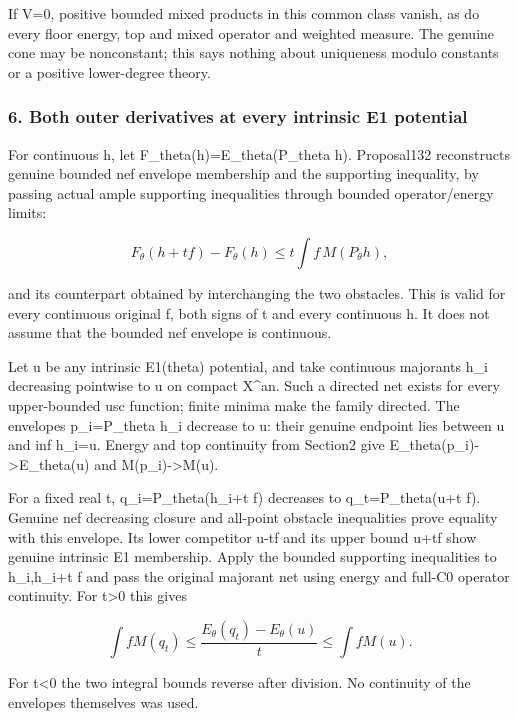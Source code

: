 \documentclass[
]{article}
\begin{document}
If V=0, positive bounded mixed products in this common class vanish, as
do every floor energy, top and mixed operator and weighted measure. The
genuine cone may be nonconstant; this says nothing about uniqueness
modulo constants or a positive lower-degree theory.

\subsubsection{6. Both outer derivatives at every intrinsic E1
potential}\label{both-outer-derivatives-at-every-intrinsic-e1-potential}

For continuous h, let F\_theta(h)=E\_theta(P\_theta h). Proposal132
reconstructs genuine bounded nef envelope membership and the supporting
inequality, by passing actual ample supporting inequalities through
bounded operator/energy limits:

\[F_\theta(h+t f)-F_\theta(h)
\le t\int f\,M(P_\theta h),\]

and its counterpart obtained by interchanging the two obstacles. This is
valid for every continuous original f, both signs of t and every
continuous h. It does not assume that the bounded nef envelope is
continuous.

Let u be any intrinsic E1(theta) potential, and take continuous
majorants h\_i decreasing pointwise to u on compact X\^{}an. Such a
directed net exists for every upper-bounded usc function; finite minima
make the family directed. The envelopes p\_i=P\_theta h\_i decrease to
u: their genuine endpoint lies between u and inf h\_i=u. Energy and top
continuity from Section2 give E\_theta(p\_i)-\textgreater E\_theta(u)
and M(p\_i)-\textgreater M(u).

For a fixed real t, q\_i=P\_theta(h\_i+t f) decreases to
q\_t=P\_theta(u+t f). Genuine nef decreasing closure and all-point
obstacle inequalities prove equality with this envelope. Its lower
competitor u-\textbar t\textbar\textbar\textbar f\textbar\textbar{} and
its upper bound u+\textbar t\textbar\textbar\textbar f\textbar\textbar{}
show genuine intrinsic E1 membership. Apply the bounded supporting
inequalities to h\_i,h\_i+t f and pass the original majorant net using
energy and full-C0 operator continuity. For t\textgreater0 this gives

\[\int fM(q_t)\le
\frac{E_\theta(q_t)-E_\theta(u)}t
\le\int fM(u).\]

For t\textless0 the two integral bounds reverse after division. No
continuity of the envelopes themselves was used.
\end{document}
